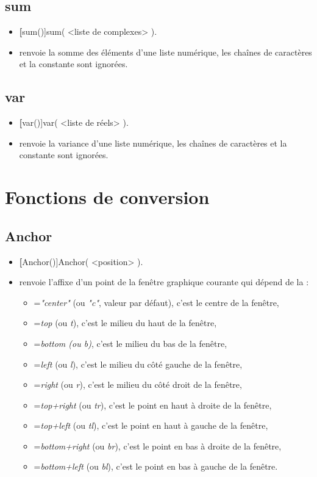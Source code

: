 \subsection{sum}
\begin{itemize}
 \item \util \textbf[sum()]{sum( <liste de complexes> )}.
 \item \desc renvoie la somme des éléments d'une liste numérique, les chaînes de caractères et la constante \jump sont ignorées.
\end{itemize}

\subsection{var}
\begin{itemize}
 \item \util \textbf[var()]{var( <liste de réels> )}.
 \item \desc renvoie la variance d'une liste numérique, les chaînes de caractères et la constante \jump sont ignorées.
\end{itemize}

\section{Fonctions de conversion}

\subsection{Anchor}
\begin{itemize}
 \item \util \textbf[Anchor()]{Anchor( <position> )}.
 \item \desc renvoie l'affixe d'un point de la fenêtre graphique courante qui dépend de la :
    \begin{itemize}
    \item {}=\emph{"center"} (ou \emph{"c"}, valeur par défaut), c'est le centre de la fenêtre,
    \item {}=\emph{top} (ou \emph{t}), c'est le milieu du haut de la fenêtre,
    \item {}=\emph{bottom (ou \emph{b})}, c'est le milieu du bas de la fenêtre,
    \item {}=\emph{left} (ou \emph{l}), c'est le milieu du côté gauche de la fenêtre,
    \item {}=\emph{right} (ou \emph{r}), c'est le milieu du côté droit de la fenêtre,
    \item {}=\emph{top+right} (ou \emph{tr}), c'est le point en haut à droite de la fenêtre,
    \item {}=\emph{top+left} (ou \emph{tl}), c'est le point en haut à gauche de la fenêtre,
    \item {}=\emph{bottom+right} (ou \emph{br}), c'est le point en bas à droite de la fenêtre,
    \item {}=\emph{bottom+left} (ou \emph{bl}), c'est le point en bas à gauche de la fenêtre.
    \end{itemize}
\end{itemize}

